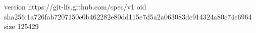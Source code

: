 version https://git-lfs.github.com/spec/v1
oid sha256:1a726fab7207150e0b462282e80dd115e7d5a2a063083dc914324a80c74e6964
size 125429
